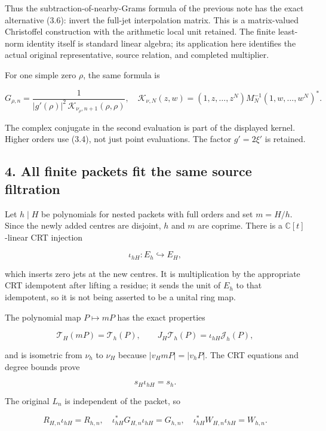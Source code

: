 \documentclass[
]{article}
\begin{document}
Thus the subtraction-of-nearby-Grams formula of the previous note has
the exact alternative (3.6): invert the full-jet interpolation matrix.
This is a matrix-valued Christoffel construction with the arithmetic
local unit retained. The finite least-norm identity itself is standard
linear algebra; its application here identifies the actual original
representative, source relation, and completed multiplier.

For one simple zero \(\rho\), the same formula is

\[G_{\rho,n}=\frac{1}{|g'(\rho)|^2\,\mathcal K_{\nu_\rho,n+1}(\rho,\rho)},\quad
\mathcal K_{\nu,N}(z,w)=(1,z,\ldots,z^N)M_N^{-1}(1,w,\ldots,w^N)^*.\tag{3.7}\]

The complex conjugate in the second evaluation is part of the displayed
kernel. Higher orders use (3.4), not just point evaluations. The factor
\(g'=2\xi'\) is retained.

\subsection{4. All finite packets fit the same source
filtration}\label{all-finite-packets-fit-the-same-source-filtration}

Let \(h\mid H\) be polynomials for nested packets with full orders and
set \(m=H/h\). Since the newly added centres are disjoint, \(h\) and
\(m\) are coprime. There is a \(\mathbb C[t]\)-linear CRT injection

\[\iota_{hH}:E_h\hookrightarrow E_H,\]

which inserts zero jets at the new centres. It is multiplication by the
appropriate CRT idempotent after lifting a residue; it sends the unit of
\(E_h\) to that idempotent, so it is not being asserted to be a unital
ring map.

The polynomial map \(P\mapsto mP\) has the exact properties

\[\mathcal T_H(mP)=\mathcal T_h(P),\qquad
J_H\mathcal T_h(P)=\iota_{hH}\mathcal J_h(P),\tag{4.1}\]

and is isometric from \(\nu_h\) to \(\nu_H\) because \(|v_HmP|=|v_hP|\).
The CRT equations and degree bounds prove

\[s_H\iota_{hH}=s_h.\]

The original \(L_n\) is independent of the packet, so

\[\boxed{R_{H,n}\iota_{hH}=R_{h,n},\quad
\iota_{hH}^*G_{H,n}\iota_{hH}=G_{h,n},\quad
\iota_{hH}^*W_{H,n}\iota_{hH}=W_{h,n}.}\tag{4.2}\]
\end{document}
